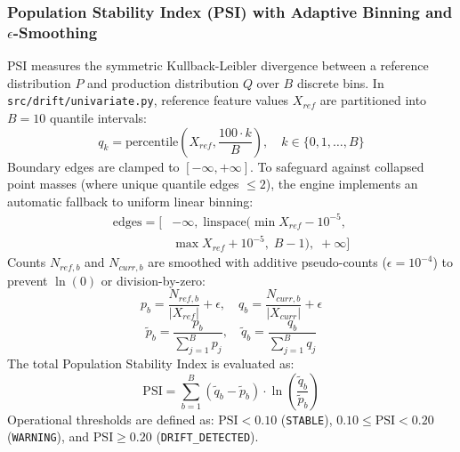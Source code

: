 \documentclass[conference]{IEEEtran}
\begin{document}
\subsubsection{Population Stability Index (PSI) with Adaptive Binning and $\epsilon$-Smoothing}
PSI measures the symmetric Kullback-Leibler divergence between a reference distribution $P$ and production distribution $Q$ over $B$ discrete bins. In \texttt{src/drift/univariate.py}, reference feature values $X_{ref}$ are partitioned into $B=10$ quantile intervals:
\begin{equation}
q_k = \text{percentile}\left(X_{ref}, \frac{100 \cdot k}{B}\right), \quad k \in \{0, 1, \dots, B\}
\end{equation}
Boundary edges are clamped to $[-\infty, +\infty]$. To safeguard against collapsed point masses (where unique quantile edges $\le 2$), the engine implements an automatic fallback to uniform linear binning:
\begin{equation}
\begin{aligned}
\text{edges} = \big[ & -\infty,\; \text{linspace}(\min X_{ref} - 10^{-5}, \\
& \max X_{ref} + 10^{-5},\; B-1),\; +\infty \big]
\end{aligned}
\end{equation}
Counts $N_{ref, b}$ and $N_{curr, b}$ are smoothed with additive pseudo-counts ($\epsilon = 10^{-4}$) to prevent $\ln(0)$ or division-by-zero:
\begin{equation}
p_b = \frac{N_{ref, b}}{|X_{ref}|} + \epsilon, \quad q_b = \frac{N_{curr, b}}{|X_{curr}|} + \epsilon
\end{equation}
\begin{equation}
\tilde{p}_b = \frac{p_b}{\sum_{j=1}^B p_j}, \quad \tilde{q}_b = \frac{q_b}{\sum_{j=1}^B q_j}
\end{equation}
The total Population Stability Index is evaluated as:
\begin{equation}
\text{PSI} = \sum_{b=1}^B (\tilde{q}_b - \tilde{p}_b) \cdot \ln\left( \frac{\tilde{q}_b}{\tilde{p}_b} \right)
\end{equation}
Operational thresholds are defined as: $\text{PSI} < 0.10$ (\texttt{STABLE}), $0.10 \le \text{PSI} < 0.20$ (\texttt{WARNING}), and $\text{PSI} \ge 0.20$ (\texttt{DRIFT\_DETECTED}).
\end{document}
